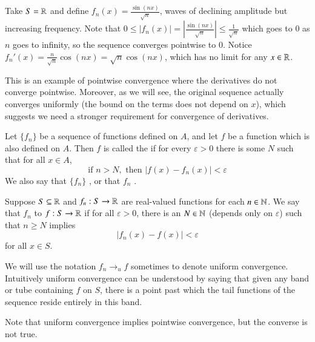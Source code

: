 \begin{eg}
    Take $S = \mathbb R$ and define $f_n(x) = \frac{\sin(nx)}{\sqrt{n}}$, waves of declining amplitude but increasing frequency. Note that $0 \leq |f_n(x)| = \left|\frac{\sin(nx)}{\sqrt{n}}\right| \leq \frac{1}{\sqrt{n}}$ which goes to $0$ as $n$ goes to infinity, so the sequence converges pointwise to $0$. Notice $f_n'(x) = \frac{n}{\sqrt{n}}\cos(nx) = \sqrt{n}\cos(nx)$, which has no limit for any $x \in \mathbb R$.
\end{eg}

This is an example of pointwise convergence where the derivatives do not converge pointwise. Moreover, as we will see, the original sequence actually converges uniformly (the bound on the terms does not depend on $x$), which suggests we need a stronger requirement for convergence of derivatives.


\begin{defn}
    Let $\{f_n\}$ be a sequence of functions defined on $A$, and let $f$ be a function which is also defined on $A$. Then $f$ is called the  if for every $\varepsilon > 0$ there is some $N$ such that for all $x \in A$, \begin{equation*}
        \text{if } n> N, \text{ then } |f(x) - f_n(x)| < \varepsilon
    \end{equation*}
    We also say that $\{f_n\}$ , or that $f_n$ .
\end{defn}


\begin{defn}
    Suppose $S \subseteq \mathbb R$ and $f_n:S\rightarrow \mathbb R$ are real-valued functions for each $n \in \mathbb N$. We say that $f_n$  to $f:S\rightarrow \mathbb R$ if for all $\varepsilon > 0$, there is an $N \in \mathbb N$ (depends only on $\varepsilon$) such that $n \geq N$ implies \begin{equation*}
        |f_n(x) - f(x)| < \varepsilon
    \end{equation*}
    for all $x \in S$.
\end{defn}

We will use the notation $f_n\rightarrow_uf$ sometimes to denote uniform convergence. Intuitively uniform convergence can be understood by saying that given any band or tube containing $f$ on $S$, there is a point past which the tail functions of the sequence reside entirely in this band.

\begin{rmk}
    Note that uniform convergence implies pointwise convergence, but the converse is not true.
\end{rmk}

